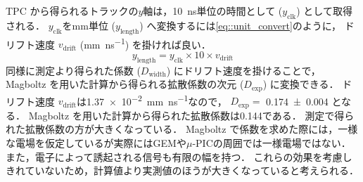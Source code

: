 \documentclass[../master]{subfiles}
\begin{document}
TPC から得られるトラックの$y$軸は，\SI{10}{\nano\second}単位の時間として ($y_{\text{clk}}$) として取得される．
$y_{\text{clk}}$を\si{\milli\metre}単位 ($y_{\text{length}}$) へ変換するには\eqref{eq::unit_convert}のように，
ドリフト速度 $v_{\text{drift}}$ (\si{\milli\metre\per\nano\second}) を掛ければ良い．
\begin{equation}
  y_{\text{length}} = y_{\text{clk}}\times 10\times v_{\text{drift}} \label{eq::unit_convert}
\end{equation}
同様に測定より得られた係数 ($D_{\text{width}}$) にドリフト速度を掛けることで，
Magboltz を用いた計算から得られる拡散係数の次元 ($D_{\text{exp}}$) に変換できる．
ドリフト速度 $v_{\text{drift}}$は\SI{1.37e-2}{\milli\metre\per\nano\second}なので，
$D_{\text{exp}} = $%
\SI{0.174\pm0.004}{\sqrt{\milli\metre}}
となる．
Magboltz を用いた計算から得られた拡散係数は\SI{0.144}{\sqrt{\milli\metre}}である．
測定で得られた拡散係数の方が大きくなっている．
Magboltz で係数を求めた際には，一様な電場を仮定しているが実際にはGEMや$\mu$-PICの周囲では一様電場ではない．
また，電子によって誘起される信号も有限の幅を持つ．
これらの効果を考慮しきれていないため，計算値より実測値のほうが大きくなっていると考えられる．
\end{document}
